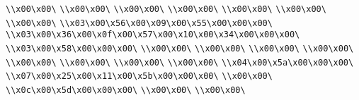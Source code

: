 \verb|\\x00\x00\|\newline
\verb|\\x00\x00\|\newline
\verb|\\x00\x00\|\newline
\verb|\\x00\x00\|\newline
\verb|\\x00\x00\|\newline
\verb|\\x00\x00\|\newline
\verb|\\x00\x00\|\newline
\verb|\\x03\x00\x56\x00\x09\x00\x55\x00\x00\x00\|\newline
\verb|\\x03\x00\x36\x00\x0f\x00\x57\x00\x10\x00\x34\x00\x00\x00\|\newline
\verb|\\x03\x00\x58\x00\x00\x00\|\newline
\verb|\\x00\x00\|\newline
\verb|\\x00\x00\|\newline
\verb|\\x00\x00\|\newline
\verb|\\x00\x00\|\newline
\verb|\\x00\x00\|\newline
\verb|\\x00\x00\|\newline
\verb|\\x00\x00\|\newline
\verb|\\x00\x00\|\newline
\verb|\\x04\x00\x5a\x00\x00\x00\|\newline
\verb|\\x07\x00\x25\x00\x11\x00\x5b\x00\x00\x00\|\newline
\verb|\\x00\x00\|\newline
\verb|\\x0c\x00\x5d\x00\x00\x00\|\newline
\verb|\\x00\x00\|\newline
\verb|\\x00\x00\|\newline
